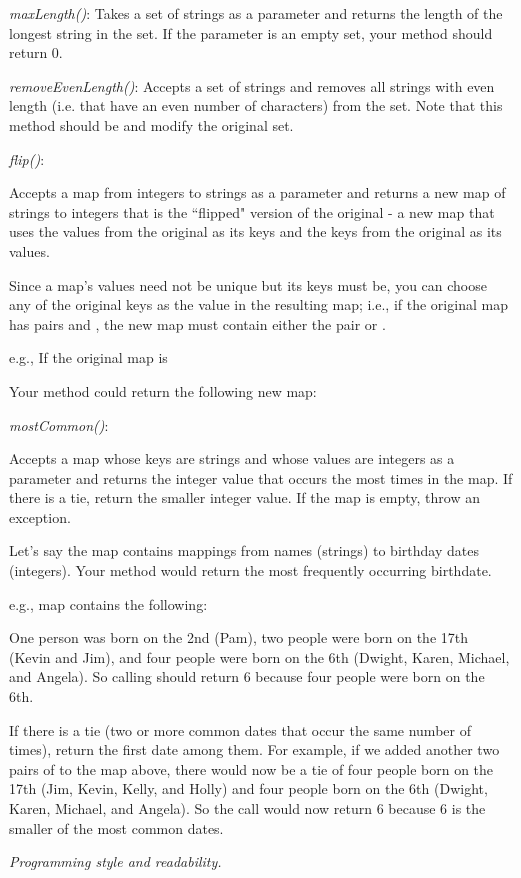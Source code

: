 \documentclass[12pt,addpoints, answers]{exam}
\begin{document}
\begin{questions}

\question[3]
\emph{maxLength()}: Takes a set of strings as a parameter and returns the length of the longest string in the set. If the parameter is an empty set, your method should return 0.

\question[3]
\emph{removeEvenLength()}: Accepts a set of strings and removes all strings with even length (i.e. that have an even number of characters) from the set. Note that this method should be  and modify the original set.

\question[4]
\emph{flip()}:

Accepts a map from integers to strings as a parameter and returns a new map of strings to integers that is the ``flipped" version of the original - a new map that uses the values from the original as its keys and the keys from the original as its values. 

Since a map's values need not be unique but its keys must be, you can choose any of the original keys as the value in the resulting map; i.e., if the original map has pairs  and , the new map must contain either the pair  or .

e.g., If the original map is 

Your method could return the following new map:

\question[5]
\emph{mostCommon()}:

Accepts a map whose keys are strings and whose values are integers as a parameter and returns the integer value that occurs the most times in the map. If there is a tie, return the smaller integer value. If the map is empty, throw an exception.

Let's say the map contains mappings from names (strings) to birthday dates (integers). Your method would return the most frequently occurring birthdate.

e.g., map  contains the following:


One person was born on the 2nd (Pam), two people were born on the 17th (Kevin and Jim), and four people were born on the 6th (Dwight, Karen, Michael, and Angela). So calling  should return 6 because four people were born on the 6th.

If there is a tie (two or more common dates that occur the same number of times), return the first date among them. For example, if we added another two pairs of  to the map above, there would now be a tie of four people born on the 17th (Jim, Kevin, Kelly, and Holly) and four people born on the 6th (Dwight, Karen, Michael, and Angela). So the call  would now return 6 because 6 is the smaller of the most common dates.

\question[1] \emph{Programming style and readability.}
\end{questions}
\end{document}
